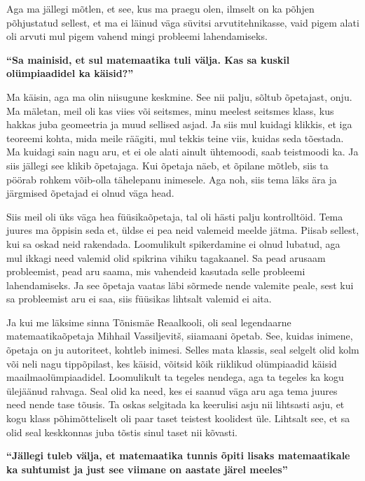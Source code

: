 Aga ma jällegi mõtlen, et see, kus ma praegu olen, ilmselt on  ka põhjen põhjustatud sellest, et ma ei läinud väga süvitsi  arvutitehnikasse, vaid pigem alati oli arvuti mul pigem vahend mingi probleemi lahendamiseks.

\textbf{\enquote{Sa mainisid, et sul matemaatika tuli välja. Kas sa kuskil olümpiaadidel ka käisid?}}

Ma käisin, aga ma olin niisugune keskmine. See nii palju, sõltub õpetajast, onju. Ma mäletan, meil oli kas viies või seitsmes, minu meelest seitsmes klass, kus hakkas juba geomeetria ja muud sellised asjad. Ja siis mul kuidagi klikkis, et iga teoreemi kohta, mida meile räägiti, mul tekkis teine viis, kuidas seda tõestada. Ma kuidagi sain nagu aru, et ei ole alati ainult ühtemoodi, saab teistmoodi ka. Ja siis jällegi see klikib õpetajaga. Kui õpetaja näeb, et õpilane mõtleb, siis ta pöörab rohkem võib-olla tähelepanu inimesele. Aga noh, siis tema läks ära ja järgmised õpetajad ei olnud väga head.

Siis meil oli üks väga hea füüsikaõpetaja, tal oli hästi palju kontrolltöid. Tema juures ma õppisin seda et, üldse ei pea neid valemeid meelde jätma. Piisab sellest, kui sa oskad neid rakendada. Loomulikult spikerdamine ei olnud lubatud, aga mul ikkagi need valemid olid spikrina vihiku tagakaanel. Sa pead arusaam probleemist, pead aru saama, mis vahendeid kasutada selle probleemi lahendamiseks. Ja see õpetaja vaatas läbi sõrmede nende valemite peale, sest kui sa  probleemist aru ei saa, siis füüsikas lihtsalt valemid ei aita. 

Ja kui me läksime sinna Tõnismäe Reaalkooli, oli seal legendaarne matemaatikaõpetaja Mihhail Vassiljevitš, siiamaani õpetab. See, kuidas inimene, õpetaja on ju autoriteet, kohtleb inimesi. Selles mata klassis, seal selgelt olid kolm või neli nagu tippõpilast, kes käisid, võitsid kõik riiklikud olümpiaadid  käisid maailmaolümpiaadidel. Loomulikult ta tegeles nendega, aga ta tegeles ka kogu ülejäänud rahvaga. Seal olid ka need, kes ei saanud väga aru aga tema juures need nende tase tõusis. Ta oskas selgitada ka keerulisi asju nii lihtsasti asju, et kogu klass  põhimõtteliselt oli paar taset teistest koolidest üle. Lihtsalt see, et sa olid seal  keskkonnas juba tõstis sinul taset nii kõvasti.


\textbf{\enquote{Jällegi tuleb välja, et matemaatika tunnis õpiti lisaks matemaatikale ka suhtumist ja just see viimane on aastate järel meeles}}

